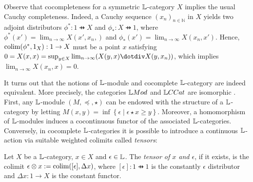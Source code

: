 Observe that cocompleteness for a symmetric $\mathbb{L}$-category $X$ implies the usual Cauchy completeness. Indeed, a Cauchy sequence $(x_{n})_{n\in \mathbb N}$ in $X$ yields two adjoint distributors $\phi^{*}:1\pfun X$ and $\phi_{*}:X\pfun 1$, where 
$\phi^{*}(x')=\lim_{n\to \infty}X(x',x_{n},)$ and
$\phi_{*}(x')=\lim_{n\to \infty}X(x_{n},x')$. Hence,  
$\mathrm{colim}(\phi^{*},1_{X}):1\to X$ must be a point $x$ satisfying $0=X(x,x)=\sup_{y\in X}\lim_{n\to \infty}(X(y,x)\menus X(y,x_{n}))$, which implies $\lim_{n\to \infty}X(x_{n},x)=0$. 





It turns out that the notions of $\mathbb{L}$-module and cocomplete $\mathbb{L}$-category are indeed equivalent. More precisely, the categories $\Mod$ and $\GMet$ are isomorphic \cite{Stubbe2006}. 
First, any $\mathbb{L}$-module $(M,\preceq, \star)$ can be endowed with the structure of a $\mathbb{L}$-category by letting
$M(x,y) = \inf\left\{ \epsilon \mid \epsilon \star x\geq y\right\}$. Moreover, a homomorphism of $\mathbb{L}$-modules induces a cocontinuous functor of the associated $\mathbb{L}$-categories. 
Conversely, in cocomplete $\mathbb{L}$-categories it is possible to introduce a continuous $\mathbb{L}$-action
via suitable weighted colimits called \emph{tensors}:
\begin{definition}
Let $X$ be a $\mathbb{L}$-category, $x\in X$ and $\epsilon \in \mathbb{L}$. The \emph{tensor of $x$ and $\epsilon$}, if it exists, is the colimit $\epsilon \otimes x:= \mathrm{colim}( [\epsilon],\Delta x)$, where
$[\epsilon]:1\pfun1$ is the constantly $\epsilon$ distributor
and $\Delta x:1\to X$ is the constant functor. 
\end{definition}

